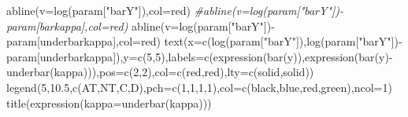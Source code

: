\documentclass[
]{book}
\newenvironment{Shaded}{\begin{snugshade}}{\end{snugshade}}
\newcommand{\AttributeTok}[1]{\textcolor[rgb]{0.77,0.63,0.00}{#1}}
\newcommand{\CommentTok}[1]{\textcolor[rgb]{0.56,0.35,0.01}{\textit{#1}}}
\newcommand{\DecValTok}[1]{\textcolor[rgb]{0.00,0.00,0.81}{#1}}
\newcommand{\FloatTok}[1]{\textcolor[rgb]{0.00,0.00,0.81}{#1}}
\newcommand{\FunctionTok}[1]{\textcolor[rgb]{0.00,0.00,0.00}{#1}}
\newcommand{\NormalTok}[1]{#1}
\newcommand{\SpecialCharTok}[1]{\textcolor[rgb]{0.00,0.00,0.00}{#1}}
\newcommand{\StringTok}[1]{\textcolor[rgb]{0.31,0.60,0.02}{#1}}
\theoremstyle{definition}
\theoremstyle{definition}
\theoremstyle{definition}
\theoremstyle{definition}
\theoremstyle{remark}
\begin{document}
\begin{Shaded}
\begin{Highlighting}[]
\FunctionTok{abline}\NormalTok{(}\AttributeTok{v=}\FunctionTok{log}\NormalTok{(param[}\StringTok{"barY"}\NormalTok{]),}\AttributeTok{col=}\StringTok{\textquotesingle{}red\textquotesingle{}}\NormalTok{)}
\CommentTok{\#abline(v=log(param["barY"]){-}param[\textquotesingle{}barkappa\textquotesingle{}],col=\textquotesingle{}red\textquotesingle{})}
\FunctionTok{abline}\NormalTok{(}\AttributeTok{v=}\FunctionTok{log}\NormalTok{(param[}\StringTok{"barY"}\NormalTok{])}\SpecialCharTok{{-}}\NormalTok{param[}\StringTok{\textquotesingle{}underbarkappa\textquotesingle{}}\NormalTok{],}\AttributeTok{col=}\StringTok{\textquotesingle{}red\textquotesingle{}}\NormalTok{)}
\FunctionTok{text}\NormalTok{(}\AttributeTok{x=}\FunctionTok{c}\NormalTok{(}\FunctionTok{log}\NormalTok{(param[}\StringTok{"barY"}\NormalTok{]),}\FunctionTok{log}\NormalTok{(param[}\StringTok{"barY"}\NormalTok{])}\SpecialCharTok{{-}}\NormalTok{param[}\StringTok{\textquotesingle{}underbarkappa\textquotesingle{}}\NormalTok{]),}\AttributeTok{y=}\FunctionTok{c}\NormalTok{(}\DecValTok{5}\NormalTok{,}\DecValTok{5}\NormalTok{),}\AttributeTok{labels=}\FunctionTok{c}\NormalTok{(}\FunctionTok{expression}\NormalTok{(}\FunctionTok{bar}\NormalTok{(}\StringTok{\textquotesingle{}y\textquotesingle{}}\NormalTok{)),}\FunctionTok{expression}\NormalTok{(}\FunctionTok{bar}\NormalTok{(}\StringTok{\textquotesingle{}y\textquotesingle{}}\NormalTok{)}\SpecialCharTok{{-}}\FunctionTok{underbar}\NormalTok{(kappa))),}\AttributeTok{pos=}\FunctionTok{c}\NormalTok{(}\DecValTok{2}\NormalTok{,}\DecValTok{2}\NormalTok{),}\AttributeTok{col=}\FunctionTok{c}\NormalTok{(}\StringTok{\textquotesingle{}red\textquotesingle{}}\NormalTok{,}\StringTok{\textquotesingle{}red\textquotesingle{}}\NormalTok{),}\AttributeTok{lty=}\FunctionTok{c}\NormalTok{(}\StringTok{\textquotesingle{}solid\textquotesingle{}}\NormalTok{,}\StringTok{\textquotesingle{}solid\textquotesingle{}}\NormalTok{))}
\FunctionTok{legend}\NormalTok{(}\DecValTok{5}\NormalTok{,}\FloatTok{10.5}\NormalTok{,}\FunctionTok{c}\NormalTok{(}\StringTok{\textquotesingle{}AT\textquotesingle{}}\NormalTok{,}\StringTok{\textquotesingle{}NT\textquotesingle{}}\NormalTok{,}\StringTok{\textquotesingle{}C\textquotesingle{}}\NormalTok{,}\StringTok{\textquotesingle{}D\textquotesingle{}}\NormalTok{),}\AttributeTok{pch=}\FunctionTok{c}\NormalTok{(}\DecValTok{1}\NormalTok{,}\DecValTok{1}\NormalTok{,}\DecValTok{1}\NormalTok{,}\DecValTok{1}\NormalTok{),}\AttributeTok{col=}\FunctionTok{c}\NormalTok{(}\StringTok{\textquotesingle{}black\textquotesingle{}}\NormalTok{,}\StringTok{\textquotesingle{}blue\textquotesingle{}}\NormalTok{,}\StringTok{\textquotesingle{}red\textquotesingle{}}\NormalTok{,}\StringTok{\textquotesingle{}green\textquotesingle{}}\NormalTok{),}\AttributeTok{ncol=}\DecValTok{1}\NormalTok{)}
\FunctionTok{title}\NormalTok{(}\FunctionTok{expression}\NormalTok{(}\AttributeTok{kappa=}\FunctionTok{underbar}\NormalTok{(kappa)))}
\end{Highlighting}
\end{Shaded}
\end{document}
